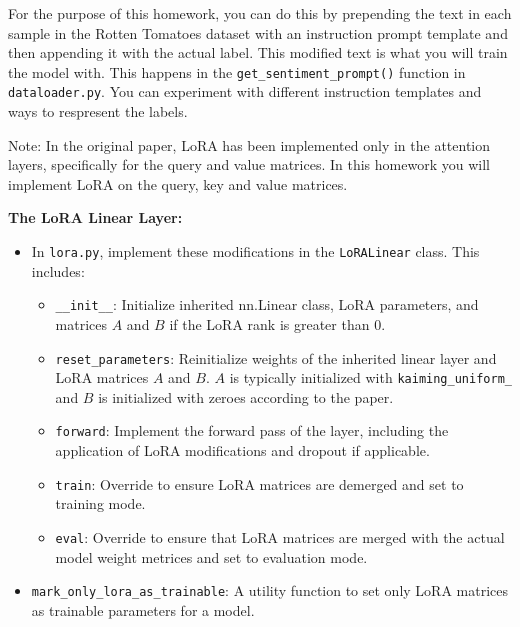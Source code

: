 \documentclass[11pt,addpoints,answers]{exam}
\begin{document}
\begin{questions}
For the purpose of this homework, you can do this by prepending the text in each sample in the Rotten Tomatoes dataset with an instruction prompt template and then appending it with the actual label. This modified text is what you will train the model with. This happens in the \lstinline{get_sentiment_prompt()} function in \lstinline{dataloader.py}. You can experiment with different instruction templates and ways to respresent the labels.

Note: In the original paper, LoRA has been implemented only in the attention layers, specifically for the query and value matrices. In this homework you will implement LoRA on the query, key and value matrices.

\textbf{The LoRA Linear Layer:}

\begin{itemize}
    \item In \lstinline{lora.py}, implement these modifications in the \lstinline{LoRALinear} class. This includes:
    \begin{itemize}
        \item \lstinline{__init__}: Initialize inherited nn.Linear class, LoRA parameters, and matrices \(A\) and \(B\) if the LoRA rank is greater than 0.
        \item \lstinline{reset_parameters}: Reinitialize weights of the inherited linear layer and LoRA matrices \(A\) and \(B\). \(A\) is typically initialized with \lstinline{kaiming_uniform_} and \(B\) is initialized with zeroes according to the paper.
        \item \lstinline{forward}: Implement the forward pass of the layer, including the application of LoRA modifications and dropout if applicable.
        \item \lstinline{train}: Override to ensure LoRA matrices are demerged and set to training mode.
        \item \lstinline{eval}: Override to ensure that LoRA matrices are merged with the actual model weight metrices and set to evaluation mode.

    \end{itemize}
        \item \lstinline{mark_only_lora_as_trainable}: A utility function to set only LoRA matrices as trainable parameters for a model. 
\end{itemize}



\end{questions}
\end{document}
